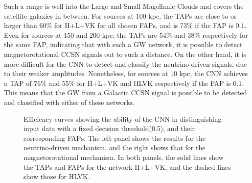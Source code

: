 \documentclass[aps,twocolumn,showpacs,groupedaddress, nofootinbib]{revtex4}  %
\begin{document}
Such a range is well into the Large and Small Magellanic Clouds and covers the satellite galaxies in between\cite{karachentsev2004catalog, belokurov2007cats}.
For sources at $100$ kpc, the \acp{TAP} are close to or larger than $60\%$ for H+L+VK for all chosen \acp{FAP}, and is $73\%$ if the \ac{FAP} is $0.1$.  
Even for sources at $150$ and $200$ kpc, the \acp{TAP} are $54\%$ and $38\%$ respectively for the same \ac{FAP}, indicating that with such a \ac{GW} network,
it is possible to detect magnetorotational \ac{CCSN} signals out to such a distance.
On the other hand, it is more difficult for the \ac{CNN} to detect and classify the neutrino-driven signals, due to their weaker amplitudes.
Nonetheless, for sources at $10$ kpc,
the \ac{CNN} achieves a \ac{TAP} of $76\%$ and $55\%$ for H+L+VK and HLVK respectively if the \ac{FAP} is $0.1$.
This means that the \ac{GW} from a Galactic \ac{CCSN} signal is possible to be detected and classified with either of these networks.
\begin{figure}
     \begin{center}
%
        \quad
%
    \end{center}
    \caption{Efficiency curves showing the ability of the \ac{CNN} in distinguishing input data with a fixed decision threshold(0.5), and their corresponding \acp{FAP}.
    The left panel shows the results for the neutrino-driven mechanism, and the right shows that for the magnetorotational mechanism.
    In both panels, the solid lines show the \acp{TAP} and \acp{FAP} for the network H+L+VK, and the dashed lines show those for HLVK.  
\label{fig:ROCfixed}}%
\end{figure}
\end{document}
